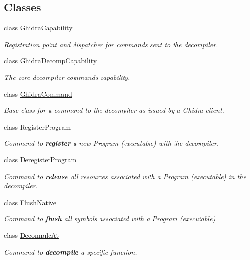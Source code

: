 \subsection*{Classes}
\begin{DoxyCompactItemize}
\item 
class \mbox{\hyperlink{class_ghidra_capability}{Ghidra\+Capability}}
\begin{DoxyCompactList}\small\item\em Registration point and dispatcher for commands sent to the decompiler. \end{DoxyCompactList}\item 
class \mbox{\hyperlink{class_ghidra_decomp_capability}{Ghidra\+Decomp\+Capability}}
\begin{DoxyCompactList}\small\item\em The core decompiler commands capability. \end{DoxyCompactList}\item 
class \mbox{\hyperlink{class_ghidra_command}{Ghidra\+Command}}
\begin{DoxyCompactList}\small\item\em Base class for a {\itshape command} to the decompiler as issued by a Ghidra client. \end{DoxyCompactList}\item 
class \mbox{\hyperlink{class_register_program}{Register\+Program}}
\begin{DoxyCompactList}\small\item\em Command to {\bfseries{register}} a new Program (executable) with the decompiler. \end{DoxyCompactList}\item 
class \mbox{\hyperlink{class_deregister_program}{Deregister\+Program}}
\begin{DoxyCompactList}\small\item\em Command to {\bfseries{release}} all resources associated with a Program (executable) in the decompiler. \end{DoxyCompactList}\item 
class \mbox{\hyperlink{class_flush_native}{Flush\+Native}}
\begin{DoxyCompactList}\small\item\em Command to {\bfseries{flush}} all symbols associated with a Program (executable) \end{DoxyCompactList}\item 
class \mbox{\hyperlink{class_decompile_at}{Decompile\+At}}
\begin{DoxyCompactList}\small\item\em Command to {\bfseries{decompile}} a specific function. \end{DoxyCompactList}\item 

\end{DoxyCompactItemize}
